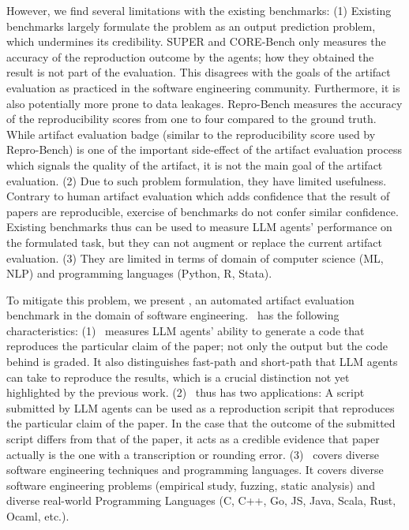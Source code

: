 However, we find several limitations with the existing benchmarks:
(1) Existing benchmarks largely formulate the problem as an output prediction problem, which undermines its credibility.
SUPER and CORE-Bench only measures the accuracy of the reproduction outcome by the agents; how they obtained the result is not part of the evaluation.
This disagrees with the goals of the artifact evaluation as practiced in the software engineering community.
Furthermore, it is also potentially more prone to data leakages.
Repro-Bench measures the accuracy of the reproducibility scores from one to four compared to the ground truth.
While artifact evaluation badge (similar to the reproducibility score used by Repro-Bench) is one of the important side-effect of the artifact evaluation process which signals the quality of the artifact, it is not the main goal of the artifact evaluation.
(2) Due to such problem formulation, they have limited usefulness.
Contrary to human artifact evaluation which adds confidence that the result of papers are reproducible, exercise of benchmarks do not confer similar confidence.
Existing benchmarks thus can be used to measure LLM agents' performance on the formulated task, but they can not augment or replace the current artifact evaluation.
(3) They are limited in terms of domain of computer science (ML, NLP) and programming languages (Python, R, Stata).

To mitigate this problem, we present \benchmark, an automated artifact evaluation benchmark in the domain of software engineering.
\benchmark~has the following characteristics:
(1) \benchmark~measures LLM agents' ability to generate a code that reproduces the particular claim of the paper; not only the output but the code behind is graded.
It also distinguishes fast-path and short-path that LLM agents can take to reproduce the results, which is a crucial distinction not yet highlighted by the previous work.
(2) \benchmark~thus has two applications:
A script submitted by LLM agents can be used as a reproduction scripit that reproduces the particular claim of the paper.
In the case that the outcome of the submitted script differs from that of the paper, it acts as a credible evidence that paper actually is the one with a transcription or rounding error.
(3) \benchmark~covers diverse software engineering techniques and programming languages.
It covers diverse software engineering problems (empirical study, fuzzing, static analysis) and diverse real-world Programming Languages (C, C++, Go, JS, Java, Scala, Rust, Ocaml, etc.).

